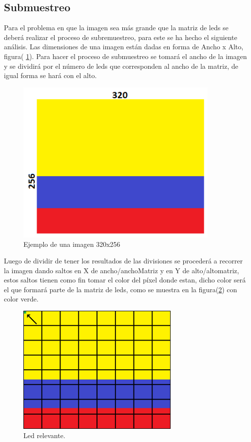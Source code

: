 \documentclass{article}
\begin{document}
\subsection{Submuestreo}
Para el problema en que la imagen sea más grande que la matriz de leds se deberá realizar el proceso de subremuestreo, para este se ha hecho el siguiente análisis.
Las dimensiones de una imagen están dadas en forma de Ancho x Alto, figura( \ref{fig:ejemplo1}). Para hacer el proceso de submuestreo se tomará el ancho de la imagen y se dividirá por el número de leds que corresponden al ancho de la matriz, de igual forma se hará con el alto.
    \begin{figure}[h]
    \includegraphics[width=10cm]{ejemplo320x256.png}
    \centering
    \caption{Ejemplo de una imagen 320x256}
    \label{fig:ejemplo1}
    \end{figure}
Luego de dividir de tener los resultados de las divisiones se procederá a recorrer la imagen dando saltos en X de ancho/anchoMatriz y en Y de alto/altomatriz, estos saltos tienen como fin tomar el color del píxel donde estan, dicho color será el que formará parte de la matriz de leds, como se muestra en la figura(\ref{fig:ledrelevante}) con color verde.
    \begin{figure}[h]
    \includegraphics[width=8cm]{ledImportante.png}
    \centering
    \caption{Led relevante.}
    \label{fig:ledrelevante}
    \end{figure}
\end{document}
